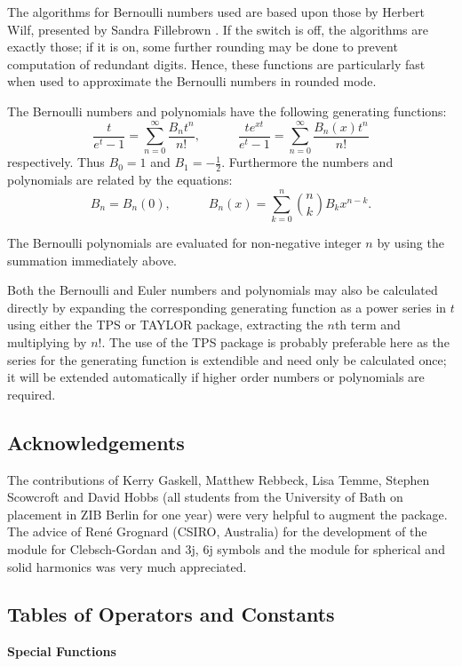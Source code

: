 The algorithms for Bernoulli numbers used are based upon those by Herbert Wilf,
presented by Sandra Fillebrown \cite{Fillebrown:92}.
If the  switch is off,
the algorithms are exactly those; if it is on, some further rounding may
be done to prevent computation of redundant digits.  Hence, these
functions are particularly fast when used to approximate the Bernoulli
numbers in rounded mode.

The Bernoulli numbers and polynomials have the following generating functions:
\[ \frac {t} {e^t-1} = \sum_{n=0}^{\infty}\frac{B_nt^n}{n!},\qquad\quad
\frac {te^{x t}} {e^t -1} = \sum_{n=0}^{\infty}\frac{B_n(x)t^n}{n!}\]
respectively. Thus $B_0=1$ and $B_1=-\frac{1}{2}$. Furthermore the numbers and
polynomials are related by the equations:
\[ B_n= B_n(0),\qquad\quad  B_n(x) = \sum_{k=0}^n \binom{n}{k} B_kx^{n-k}.\]

The Bernoulli polynomials are evaluated for non-negative integer $n$ by using
the summation immediately above.

Both the Bernoulli and Euler numbers and polynomials may also be calculated
directly by expanding the corresponding generating function as a power
series in $t$ using either the TPS or TAYLOR package, extracting the $n$th term
and multiplying by $n!$. The use of the TPS package is probably preferable here
as the series for the generating function is extendible and need only be
calculated once; it will be extended automatically if higher order numbers or
polynomials are required.

\subsection{Acknowledgements}

The contributions of Kerry Gaskell, Matthew Rebbeck, Lisa Temme,
Stephen Scowcroft and David Hobbs (all students from the University of Bath
on placement in ZIB Berlin for one year) were very helpful
to augment the package. The advice of Ren\'e Grognard (CSIRO, Australia)
for the development of the module for Clebsch-Gordan and 3j, 6j symbols
and the module for spherical and solid harmonics was very much appreciated.
\newpage

\subsection{Tables of Operators and Constants}
\hypertarget{SPECFNTAB1}{}

\textbf{Special Functions}

